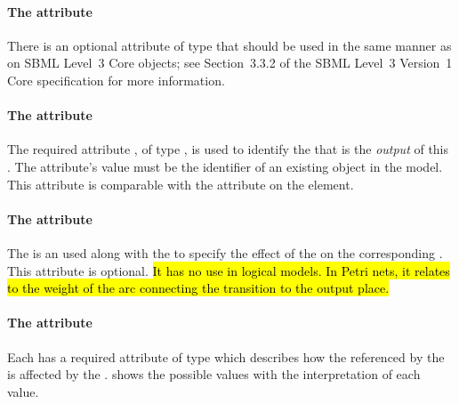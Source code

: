 \paragraph{The  attribute}
There is an optional  attribute of type  that should be used
in the same manner as on SBML Level~3 Core
objects; see Section~3.3.2 of the SBML Level~3 Version~1 Core
specification for more information.



\paragraph{The  attribute}
The required attribute , of type , is used to identify the \QualitativeSpecies that is the \emph{output} of this \Transition.  The attribute's value must be the identifier of an existing \QualitativeSpecies object in the model.  This attribute is comparable with the  attribute on the  element.

\paragraph{The  attribute}
The  is an  used along with the  to specify the effect of the \Transition on the corresponding \QualitativeSpecies. This attribute is optional.  \hl{It has no use in logical models. In Petri nets, it relates to the weight of the arc connecting the transition to the output place.}

\paragraph{The  attribute}
Each \Output has a required attribute  of type  which describes how the \QualitativeSpecies referenced by the \Output is affected by the \Transition.  shows the possible values with the interpretation of each value.




